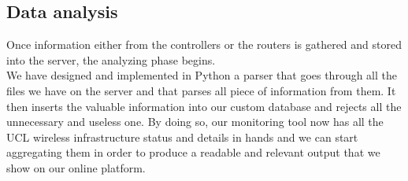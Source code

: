\subsection{Data analysis}
Once information either from the controllers or the routers is gathered and stored into the server, the analyzing phase begins.\\
We have designed and implemented in Python a parser that goes through all the files we have on the server and that parses all piece of information from them. It then inserts the valuable information into our custom database and rejects all the unnecessary and useless one. By doing so, our monitoring tool now has all the UCL wireless infrastructure status and details in hands and we can start aggregating them in order to produce a readable and relevant output that we show on our online platform.\\


